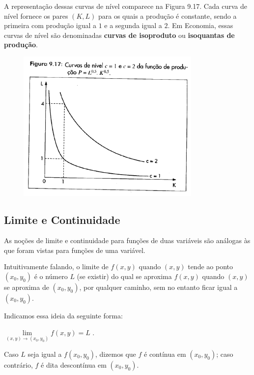 			\medskip

			A representação dessas curvas de nível comparece na Figura 9.17. Cada curva de nível fornece os pares $(K, L)$ para os quais a produção é constante, sendo a primeira com produção igual a $1$ e a segunda igual a $2$. Em Economia, essas curvas de nível são denominadas \textbf{curvas de isoproduto} ou \textbf{isoquantas de produção}.

			\begin{figure}[H]
				\includegraphics[height=7.5cm]{images/morettin_figura-9-17}
			\end{figure}
			
	\subsection{Limite e Continuidade \cite{morettin}}

		As noções de limite e continuidade para funções de duas variáveis são análogas às que foram vistas para funções de uma variável.

		Intuitivamente falando, o limite de $f(x, y)$ quando $(x, y)$ tende ao ponto $(x_{0}, y_{0})$ é o número $L$ (se existir) do qual se aproxima $f(x, y)$ quando $(x, y)$ se aproxima de $(x_{0}, y_{0})$, por qualquer caminho, sem no entanto ficar igual a $(x_{0}, y_{0})$.

		Indicamos essa ideia da seguinte forma:

		\bigskip

		{\LARGE $\lim \limits_{(x, y) \to (x_{0}, y_{0})} f(x, y) = L$} .

		\bigskip

		Caso $L$ seja igual a $f(x_{0}, y_{0})$, dizemos que $f$ é contínua em $(x_{0}, y_{0})$; caso contrário, $f$ é dita descontínua em $(x_{0}, y_{0})$.
		
